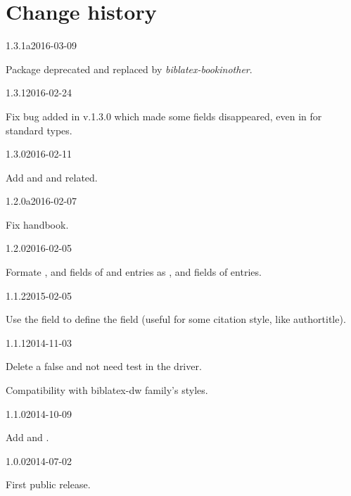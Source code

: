 \documentclass{ltxdockit}[2011/03/25]
\begin{document}
\section{Change history}


\begin{changelog}


\begin{release}{1.3.1a}{2016-03-09}
\item Package deprecated and replaced by \emph{biblatex-bookinother}.
\end{release}

\begin{release}{1.3.1}{2016-02-24}
\item Fix bug added in v.1.3.0 which made some fields disappeared, even in for standard types.
\end{release}

\begin{release}{1.3.0}{2016-02-11}
\item Add  and  and related.
\end{release}

\begin{release}{1.2.0a}{2016-02-07}
\item Fix handbook.
\end{release}

\begin{release}{1.2.0}{2016-02-05}
\item Formate   ,  and  fields of   and  entries as ,  and  fields of  entries.
\end{release}

\begin{release}{1.1.2}{2015-02-05}
\item Use the  field to define the  field (useful for some citation style, like authortitle).
\end{release}

\begin{release}{1.1.1}{2014-11-03}
\item Delete a false and not need test in the driver.
\item Compatibility with biblatex-dw family's styles.
\end{release}
\begin{release}{1.1.0}{2014-10-09}
\item Add  and .
\end{release}

\begin{release}{1.0.0}{2014-07-02}
\item First public release.
\end{release}
\end{changelog}
\end{document}
